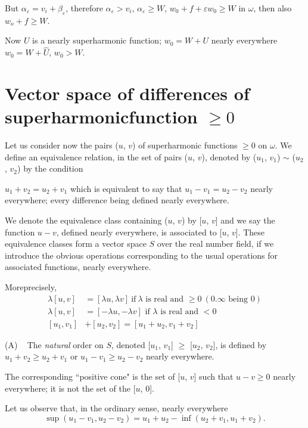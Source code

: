 But $\alpha_{\varepsilon} = v_i + \beta_{\varepsilon}$, therefore
$\alpha_{\varepsilon} > v_i$, $\alpha_{\varepsilon} \ge W$, $w_0 + f +
\varepsilon w_0 \ge W $ in $\omega$, then also $w_o + f \ge W$. 

Now $U$ is a nearly superharmonic function; $w_0 = W + U$ nearly
everywhere $w_0 = W + \hat{U}$, $w_0 > W$. 

\section[Vector space of differences of...]{Vector space of differences of superharmonic\break function $\ge
  0$}\label{p4:chap4:sec19} %

Let us consider now the pairs ($u$, $v$) of superharmonic functions
$\ge 0$ on $\omega$. We define an equivalence relation, in the set of
pairs ($u$, $v$), denoted by ($u_1$, $v_1$) $\sim$ ($u_2$, $v_2$) by
the condition 

$u_1 + v_2 = u_2 + v_1$ which is equivalent to say that $u_1 - v_1 =
u_2 - v_2$ nearly everywhere; every difference being defined nearly
everywhere. 

We denote the equivalence class containing ($u$, $v$) by [$u$, $v$]
and we say the function $u - v$, defined nearly everywhere, is
associated to [$u$, $v$]. These equivalence classes form a vector
space $S$ over the real number field, if we introduce the obvious
operations corresponding to the usual operations for associated
functions, nearly everywhere. 

More\pageoriginale precisely,
\begin{align*}
  \lambda [u,v ] &  =[\lambda u, \lambda v] ~\text{if}~ \lambda \text{ is real
    and }\ge 0 ~(0.  \infty \text{ being } 0) \\ 
  \lambda [u,v ] &  =[- \lambda u, - \lambda v] \text { if } \lambda
  \text{ is real and }<  0 \\ 
       [u_1, v_1] & + [u_2,  v_2] = [u_1 + u_2,  v_1 + v_2]
\end{align*}

(A) ~ The \textit{natural} order on $S$, denoted [$u_1$, $v_1$] $\ge$
[$u_2$, $v_2$], is defined by $u_1 + v_2 \ge u_2 + v_1$ or $u_1 - v_1
\ge u_2 - v_2$ nearly everywhere. 

The corresponding ``positive cone" is the set of [$u$, $v$] such that
$u - v\ge 0$ nearly everywhere; it is not the set of the [$u$, $0$]. 
 
Let us observe that, in the ordinary sense, nearly everywhere
$$
\sup (u_1 - v_1,  u_2 - v_2) = u_1 + u_2 - \inf (u_2 + v_1,  u_1 + v_2).
$$

